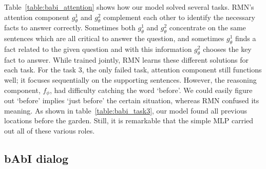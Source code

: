 \documentclass{article} \usepackage{iclr2018_conference,times}
\begin{document}
Table~\ref{table:babi_attention} shows how our model solved several tasks.
RMN's attention component $g_\theta^1$ and $g_\theta^2$ complement each other to identify the necessary facts to answer correctly.
Sometimes both $g_\theta^1$ and $g_\theta^2$ concentrate on the same sentences which are all critical to answer the question, and sometimes $g_\theta^1$ finds a fact related to the given question and with this information $g_\theta^2$ chooses the key fact to answer. 
While trained jointly, RMN learns these different solutions for each task.
For the task 3, the only failed task, attention component still functions well; it focuses sequentially on the  supporting sentences.  
However, the reasoning component, $f_\phi$, had difficulty catching the word `before'. 
We could easily figure out `before' implies `just before' the certain situation, whereas RMN confused its meaning. 
As shown in table~\ref{table:babi_task3}, our model found all previous locations before the garden. 
Still, it is remarkable that the simple MLP carried out all of these various roles. 



\subsection{bAbI dialog}
\end{document}
